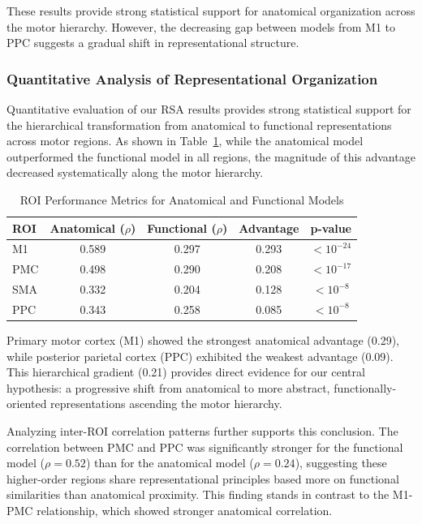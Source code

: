 \documentclass{article}
\begin{document}
These results provide strong statistical support for anatomical organization across the motor hierarchy. However, the decreasing gap between models from M1 to PPC suggests a gradual shift in representational structure.

\subsubsection{Quantitative Analysis of Representational Organization}

Quantitative evaluation of our RSA results provides strong statistical support for the hierarchical transformation from anatomical to functional representations across motor regions. As shown in Table~\ref{tab:roi_metrics}, while the anatomical model outperformed the functional model in all regions, the magnitude of this advantage decreased systematically along the motor hierarchy.

\begin{table}[h]
\centering
\caption{ROI Performance Metrics for Anatomical and Functional Models}
\label{tab:roi_metrics}
\begin{tabular}{|l|c|c|c|c|}
\hline
\textbf{ROI} & \textbf{Anatomical ($\rho$)} & \textbf{Functional ($\rho$)} & \textbf{Advantage} & \textbf{p-value} \\
\hline
M1 & 0.589 & 0.297 & 0.293 & $< 10^{-24}$ \\
PMC & 0.498 & 0.290 & 0.208 & $< 10^{-17}$ \\
SMA & 0.332 & 0.204 & 0.128 & $< 10^{-8}$ \\
PPC & 0.343 & 0.258 & 0.085 & $< 10^{-8}$ \\
\hline
\end{tabular}
\end{table}

Primary motor cortex (M1) showed the strongest anatomical advantage (0.29), while posterior parietal cortex (PPC) exhibited the weakest advantage (0.09). This hierarchical gradient (0.21) provides direct evidence for our central hypothesis: a progressive shift from anatomical to more abstract, functionally-oriented representations ascending the motor hierarchy.

Analyzing inter-ROI correlation patterns further supports this conclusion. The correlation between PMC and PPC was significantly stronger for the functional model ($\rho = 0.52$) than for the anatomical model ($\rho = 0.24$), suggesting these higher-order regions share representational principles based more on functional similarities than anatomical proximity. This finding stands in contrast to the M1-PMC relationship, which showed stronger anatomical correlation.
\end{document}
